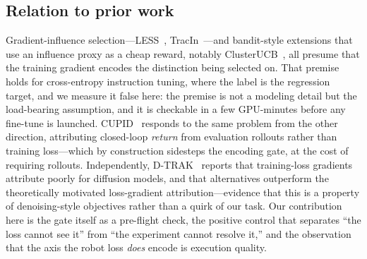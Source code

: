 \subsection{Relation to prior work}
\label{sec:grad_related}
Gradient-influence selection---LESS~\cite{less}, TracIn~\cite{tracin}---and
bandit-style extensions that use an influence proxy as a cheap reward, notably
ClusterUCB~\cite{clusterucb}, all presume that the training gradient encodes the
distinction being selected on. That premise holds for cross-entropy
instruction tuning, where the label is the regression target, and we measure it
false here: the premise is not a modeling detail but the load-bearing
assumption, and it is checkable in a few GPU-minutes before any fine-tune is
launched. CUPID~\cite{cupid} responds to the same problem from the other
direction, attributing closed-loop \emph{return} from evaluation rollouts rather
than training loss---which by construction sidesteps the encoding gate, at the
cost of requiring rollouts. Independently, D-TRAK~\cite{dtrak} reports that
training-loss gradients attribute poorly for diffusion models, and that
alternatives outperform the theoretically motivated loss-gradient
attribution---evidence that this is a property of denoising-style objectives
rather than a quirk of our task. Our contribution here is the gate itself as a
pre-flight check, the positive control that separates ``the loss cannot see it''
from ``the experiment cannot resolve it,'' and the observation that the axis the
robot loss \emph{does} encode is execution quality.

